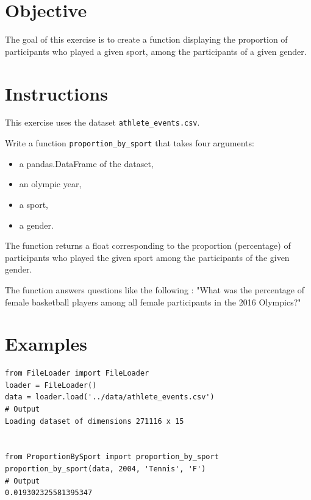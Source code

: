 \documentclass{42-en}
\begin{document}
\section*{Objective}
The goal of this exercise is to create a function displaying
the proportion of participants who played a given sport, among
the participants of a given gender.

\section*{Instructions}
This exercise uses the dataset \texttt{athlete\_events.csv}.

Write a function \texttt{proportion\_by\_sport} that takes four arguments:
\begin{itemize}
  \item a pandas.DataFrame of the dataset,
  \item an olympic year,
  \item a sport,
  \item a gender.
\end{itemize}

The function returns a float corresponding to the proportion (percentage) of participants 
who played the given sport among the participants of the given gender.

The function answers questions like the following : 
"What was the percentage of female basketball players among all female 
participants in the 2016 Olympics?"


\section*{Examples}
\begin{verbatim}
from FileLoader import FileLoader
loader = FileLoader()
data = loader.load('../data/athlete_events.csv')
# Output
Loading dataset of dimensions 271116 x 15


from ProportionBySport import proportion_by_sport
proportion_by_sport(data, 2004, 'Tennis', 'F')
# Output
0.019302325581395347
\end{verbatim}
\end{document}
